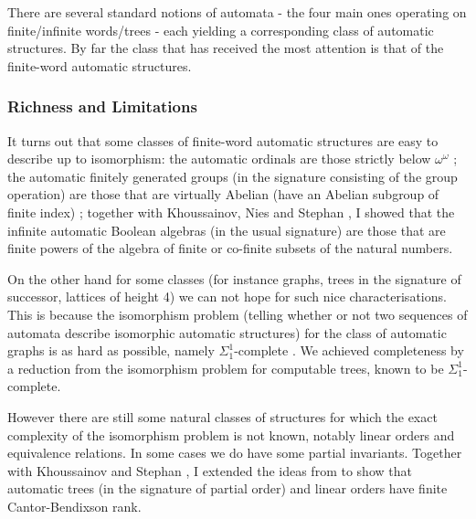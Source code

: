 \documentclass[11pt]{article}
\theoremstyle{plain} \numberwithin{equation}{section}
\theoremstyle{definition}
\begin{document}
There are several standard notions of automata - the four main ones operating on finite/infinite words/trees - each yielding a corresponding class of automatic structures. By far the class that has received the most attention is that of the finite-word automatic structures.

\subsubsection*{Richness and Limitations}
\noindent
It turns out that some classes of finite-word automatic structures are easy to describe up to isomorphism: the automatic ordinals are those strictly below $\omega^\omega$ \cite{Delh04}; the automatic finitely generated groups (in the signature consisting of the group operation) are those that are virtually Abelian (have an Abelian subgroup of finite index) \cite{OlTh05};
together with Khoussainov, Nies and Stephan \cite{KNRS04}, I showed that the infinite automatic Boolean algebras (in the usual signature) are those that are finite powers of the algebra of finite or co-finite subsets of the natural numbers.

On the other hand for some classes (for instance graphs, trees in the signature of successor, lattices of height 4) we can not hope for such nice characterisations. This is because the isomorphism problem (telling whether or not two sequences of automata describe isomorphic automatic structures) for the class of automatic graphs is as hard as possible, namely $\Sigma_1^1$-complete \cite{KNRS04}. We achieved completeness by a reduction from the isomorphism problem for computable trees, known to be $\Sigma_1^1$-complete.

However there are still some natural classes of structures for which the exact complexity of the isomorphism problem is not known, notably linear orders and equivalence relations. In some cases we do have some partial invariants. Together with Khoussainov and Stephan \cite{KRS05}, I extended the ideas from \cite{Delh04} to show that automatic trees (in the signature of partial order) and linear orders have finite Cantor-Bendixson rank.

\end{document}

